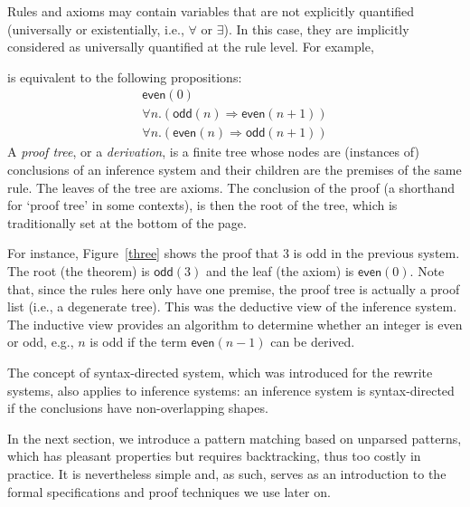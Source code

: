 Rules and axioms may contain variables that are not explicitly
quantified (universally or existentially, i.e., \(\forall\) or
\(\exists\)). In this case, they are implicitly considered as
universally quantified at the rule level. For example,
is equivalent to the following propositions:
\begin{gather*}
\textsf{even}(0)\\
\forall n.(\textsf{odd}(n) \Rightarrow \textsf{even}(n+1))\\
\forall n.(\textsf{even}(n) \Rightarrow \textsf{odd}(n+1))
\end{gather*}
A \emph{proof tree}, or a \emph{derivation}, is a finite tree whose
nodes are (instances of) conclusions of an inference system and their
children are the premises of the same rule. The leaves of the tree are
axioms. The conclusion of the proof (a shorthand for `proof tree' in
some contexts), is then the root of the tree, which is traditionally
set at the bottom of the page.

\smallskip
{}

\noindent For instance, Figure~\ref{three} shows the proof that \(3\)
is odd in the previous system. The root (the theorem) is
\(\textsf{odd}(3)\) and the leaf (the axiom) is
\(\textsf{even}(0)\). Note that, since the rules here only have one
premise, the proof tree is actually a proof list (i.e., a degenerate
tree). This was the deductive view of the inference system. The
inductive view provides an algorithm to determine whether an integer
is even or odd, e.g., \(n\) is odd if the term \(\textsf{even}(n-1)\)
can be derived.

The concept of syntax\hyp{}directed system, which was introduced for
the rewrite systems, also applies to inference systems: an inference
system is syntax\hyp{}directed if the conclusions have
non\hyp{}overlapping shapes.

In the next section, we introduce a pattern matching based on unparsed
patterns, which has pleasant properties but requires backtracking,
thus too costly in practice. It is nevertheless simple and, as such,
serves as an introduction to the formal specifications and proof
techniques we use later on.
